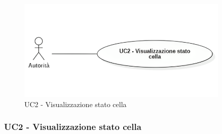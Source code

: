 \documentclass{article}
\begin{document}
\begin{figure}[H]
    \centering
    \includegraphics[width=0.9\textwidth]{Images/uc2.png}
    \caption{UC2 - Visualizzazione stato cella}
    \label{fig:UC2}
\end{figure}

\subsubsection{UC2 - Visualizzazione stato cella}
\end{document}
